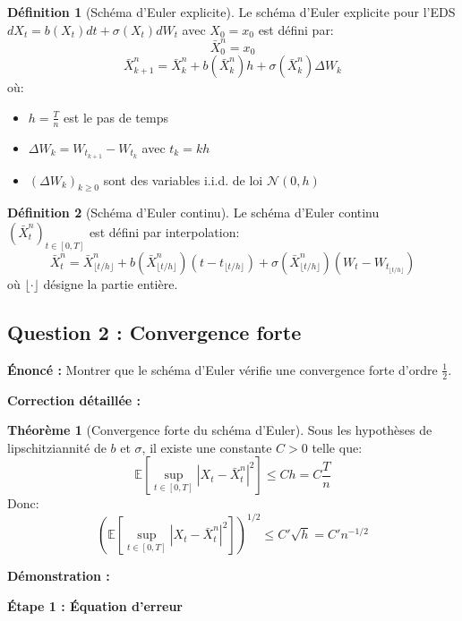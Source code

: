 \documentclass[12pt,a4paper]{article}
\theoremstyle{definition}
\newtheorem{definition}{Définition}[section]
\newtheorem{theorem}{Théorème}[section]
\newcommand{\E}{\mathbb{E}}
\begin{document}
\begin{definition}[Schéma d'Euler explicite]
Le schéma d'Euler explicite pour l'EDS $dX_t = b(X_t)dt + \sigma(X_t)dW_t$ avec $X_0 = x_0$ est défini par:
\[
\bar{X}_0^n = x_0
\]
\[
\bar{X}_{k+1}^n = \bar{X}_k^n + b(\bar{X}_k^n) h + \sigma(\bar{X}_k^n) \Delta W_k
\]
où:
\begin{itemize}
    \item $h = \frac{T}{n}$ est le pas de temps
    \item $\Delta W_k = W_{t_{k+1}} - W_{t_k}$ avec $t_k = kh$
    \item $(\Delta W_k)_{k \geq 0}$ sont des variables i.i.d. de loi $\mathcal{N}(0, h)$
\end{itemize}
\end{definition}

\begin{definition}[Schéma d'Euler continu]
Le schéma d'Euler continu $(\bar{X}_t^n)_{t \in [0,T]}$ est défini par interpolation:
\[
\bar{X}_t^n = \bar{X}_{\lfloor t/h \rfloor}^n + b(\bar{X}_{\lfloor t/h \rfloor}^n)(t - t_{\lfloor t/h \rfloor}) + \sigma(\bar{X}_{\lfloor t/h \rfloor}^n)(W_t - W_{t_{\lfloor t/h \rfloor}})
\]
où $\lfloor \cdot \rfloor$ désigne la partie entière.
\end{definition}

\subsection{Question 2 : Convergence forte}

\textbf{Énoncé :} Montrer que le schéma d'Euler vérifie une convergence forte d'ordre $\frac{1}{2}$.

\textbf{Correction détaillée :}

\begin{theorem}[Convergence forte du schéma d'Euler]
Sous les hypothèses de lipschitziannité de $b$ et $\sigma$, il existe une constante $C > 0$ telle que:
\[
\E\left[ \sup_{t \in [0,T]} |X_t - \bar{X}_t^n|^2 \right] \leq C h = C \frac{T}{n}
\]
Donc:
\[
\left( \E\left[ \sup_{t \in [0,T]} |X_t - \bar{X}_t^n|^2 \right] \right)^{1/2} \leq C' \sqrt{h} = C' n^{-1/2}
\]
\end{theorem}

\textbf{Démonstration :}

\textbf{Étape 1 : Équation d'erreur}
\end{document}
